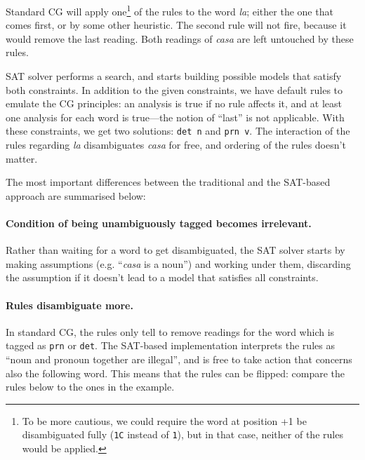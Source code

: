 \documentclass[11pt]{article}
\begin{document}
Standard CG will apply one\footnote{To be more cautious, we could require the word at position +1 be disambiguated fully (\texttt{1C} instead of \texttt{1}), but in that case, 
neither of the rules would be applied.} of the rules to the word \emph{la}; 
either the one that comes first, or by some other heuristic. 
The second rule will not fire, because it would remove the last reading. 
Both readings of \emph{casa} are left untouched by these rules.

SAT solver 
performs a search, 
and starts building possible models that satisfy both constraints. 
In addition to the given constraints, we have default rules to emulate
the CG principles: an analysis is true if no rule affects it,
and at least one analysis for each word is true---the notion of ``last'' is not applicable.
With these constraints, we get two solutions: \texttt{det n} and \texttt{prn v}. 
The interaction of the rules regarding \emph{la}  disambiguates \emph{casa} 
for free, and ordering of the rules doesn't matter. 


The most important differences between the traditional and the SAT-based approach are summarised below:

\paragraph{Condition of being unambiguously tagged becomes irrelevant.}
Rather than waiting for a word to get disambiguated, the SAT solver starts by 
making assumptions (e.g. ``\emph{casa} is a noun'') and working under them,
discarding the assumption if it doesn't lead to a model that satisfies all constraints.


\paragraph{Rules disambiguate more.}
In standard CG, the rules only tell to remove readings for the word which is tagged as 
\texttt{prn} or \texttt{det}. The SAT-based implementation interprets the rules as ``noun and pronoun together are illegal'', and is free to take action that concerns also the following word.
This means that the rules can be flipped: compare the rules below to the ones in the example.
\end{document}

